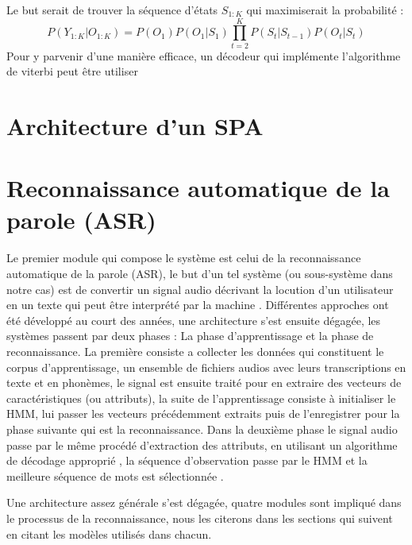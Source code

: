 	\par
	Le but serait de trouver la séquence d'états $S_{1:K}$ qui maximiserait la probabilité \cite{hmm_intro} : 
	\begin{equation}
		P(Y_{1:K} | O_{1:K}) = P(O_1)P(O_1|S_1)\prod_{t=2}^{K}P(S_t|S_{t-1})P(O_t|S_t) 
	\end{equation}
	Pour y parvenir d'une manière efficace, un décodeur qui implémente l'algorithme de viterbi peut être utiliser \cite{viterbi}\cite{viterbi_hmm}
\section{Architecture d'un SPA}
\section{Reconnaissance automatique de la parole (ASR)}
	\paragraph{}
	Le premier module qui compose le système est celui de la reconnaissance automatique de la parole (ASR), le but d'un tel système (ou sous-système dans notre cas) est de convertir un signal audio décrivant la locution d'un utilisateur en un texte qui peut être interprété par la machine \cite{asr_definition}. Différentes approches ont été développé au court des années, une architecture s'est ensuite dégagée, les systèmes passent par deux phases : La phase d'apprentissage et la phase de reconnaissance. La première consiste a collecter les données qui constituent le corpus d'apprentissage, un ensemble de fichiers audios avec leurs transcriptions en texte et en phonèmes, le signal est ensuite traité pour en extraire des vecteurs de caractéristiques (ou attributs), la suite de l'apprentissage consiste à initialiser le HMM, lui passer les vecteurs précédemment extraits puis de l'enregistrer pour la phase suivante qui est la reconnaissance. Dans la deuxième phase le signal audio passe par le même procédé d'extraction des attributs, en utilisant un algorithme de décodage approprié \cite{viterbi_hmm}, la séquence d'observation passe par le HMM et la meilleure séquence de mots est sélectionnée \cite{speech_reco_Yu2015}.
	\par Une architecture assez générale s'est dégagée, quatre modules sont impliqué dans le processus de la reconnaissance, nous les citerons dans les sections qui suivent en citant les modèles utilisés dans chacun.
	
